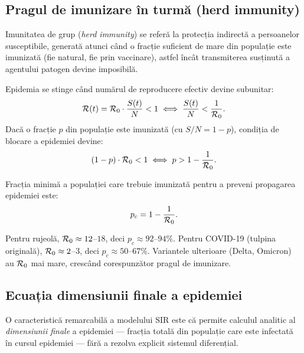 \subsection{Pragul de imunizare în turmă (herd immunity)}
\label{subsec:herd_immunity}

\begin{definitie}
Imunitatea de grup (\emph{herd immunity}) se referă la protecția indirectă a
persoanelor susceptibile, generată atunci când o fracție suficient de mare
din populație este imunizată (fie natural, fie prin vaccinare), astfel încât
transmiterea susținută a agentului patogen devine imposibilă.
\end{definitie}

Epidemia se stinge când numărul de reproducere efectiv devine subunitar:
\begin{equation}
    \mathcal{R}(t) = \mathcal{R}_0 \cdot \frac{S(t)}{N} < 1 \iff \frac{S(t)}{N} < \frac{1}{\mathcal{R}_0}.
\end{equation}
Dacă o fracție $p$ din populație este imunizată (cu $S/N = 1 - p$), condiția
de blocare a epidemiei devine:
\begin{equation}
    (1 - p) \cdot \mathcal{R}_0 < 1 \iff p > 1 - \frac{1}{\mathcal{R}_0}.
\end{equation}

\begin{definitie}
Fracția minimă a populației care trebuie imunizată pentru a preveni propagarea
epidemiei este:
\begin{equation}
\label{eq:herd_immunity}
    p_c = 1 - \frac{1}{\mathcal{R}_0}.
\end{equation}
\end{definitie}

\begin{exemplu}
Pentru rujeolă, $\mathcal{R}_0 \approx 12$--$18$, deci $p_c \approx 92$--$94\%$.
Pentru COVID-19 (tulpina originală), $\mathcal{R}_0 \approx 2$--$3$, deci
$p_c \approx 50$--$67\%$. Variantele ulterioare (Delta, Omicron) au $\mathcal{R}_0$
mai mare, crescând corespunzător pragul de imunizare.
\end{exemplu}

\subsection{Ecuația dimensiunii finale a epidemiei}
\label{subsec:final_size}

O caracteristică remarcabilă a modelului SIR este că permite calculul analitic al
\emph{dimensiunii finale} a epidemiei --- fracția totală din populație care este
infectată în cursul epidemiei --- fără a rezolva explicit sistemul diferențial.

